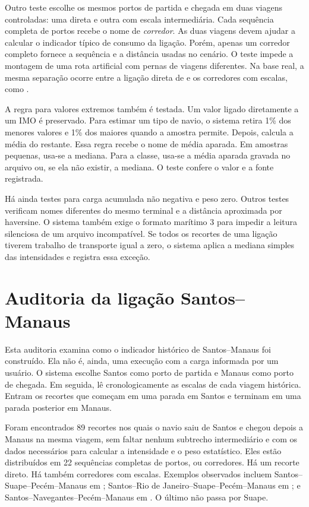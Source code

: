 Outro teste escolhe os mesmos portos de partida e chegada em duas viagens controladas: uma direta e outra com escala intermediária. Cada sequência completa de portos recebe o nome de \emph{corredor}. As duas viagens devem ajudar a calcular o indicador típico de consumo da ligação. Porém, apenas um corredor completo fornece a sequência e a distância usadas no cenário. O teste impede a montagem de uma rota artificial com pernas de viagens diferentes. Na base real, a mesma separação ocorre entre a ligação direta de  e os corredores com escalas, como .

A regra para valores extremos também é testada. Um valor ligado diretamente a um IMO é preservado. Para estimar um tipo de navio, o sistema retira 1\% dos menores valores e 1\% dos maiores quando a amostra permite. Depois, calcula a média do restante. Essa regra recebe o nome de média aparada. Em amostras pequenas, usa-se a mediana. Para a classe, usa-se a média aparada gravada no arquivo ou, se ela não existir, a mediana. O teste confere o valor e a fonte registrada.

Há ainda testes para carga acumulada não negativa e peso zero. Outros testes verificam nomes diferentes do mesmo terminal e a distância aproximada por haversine. O sistema também exige o formato marítimo 3 para impedir a leitura silenciosa de um arquivo incompatível. Se todos os recortes de uma ligação tiverem trabalho de transporte igual a zero, o sistema aplica a mediana simples das intensidades e registra essa exceção.

\section{Auditoria da ligação Santos--Manaus}
\label{sec:auditoria-santos-manaus}

Esta auditoria examina como o indicador histórico de Santos--Manaus foi construído. Ela não é, ainda, uma execução com a carga informada por um usuário. O sistema escolhe Santos como porto de partida e Manaus como porto de chegada. Em seguida, lê cronologicamente as escalas de cada viagem histórica. Entram os recortes que começam em uma parada em Santos e terminam em uma parada posterior em Manaus.

Foram encontrados \num{89} recortes nos quais o navio saiu de Santos e chegou depois a Manaus na mesma viagem, sem faltar nenhum subtrecho intermediário e com os dados necessários para calcular a intensidade e o peso estatístico. Eles estão distribuídos em \num{22} sequências completas de portos, ou corredores. Há um recorte direto. Há também corredores com escalas. Exemplos observados incluem Santos--Suape--Pecém--Manaus em ; Santos--Rio de Janeiro--Suape--Pecém--Manaus em ; e Santos--Navegantes--Pecém--Manaus em . O último não passa por Suape.

